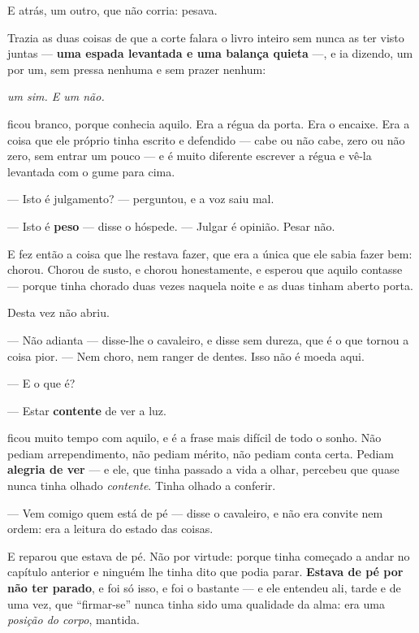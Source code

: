 \documentclass[livro.tex]{subfiles}
\begin{document}
\medskip
\noindent E atrás, um outro, que não corria: pesava.

\medskip
\noindent Trazia as duas coisas de que a corte falara o livro inteiro sem
nunca as ter visto juntas --- \textbf{uma espada levantada e uma balança
quieta} ---, e ia dizendo, um por um, sem pressa nenhuma e sem prazer nenhum:

\begin{center}
\emph{um sim. E um não.}
\end{center}

\noindent \Ben ficou branco, porque conhecia aquilo. Era a régua da porta. Era
o encaixe. Era a coisa que ele próprio tinha escrito e defendido --- cabe ou não
cabe, zero ou não zero, sem entrar um pouco --- e é muito diferente escrever a
régua e vê-la levantada com o gume para cima.

\medskip
\noindent --- Isto é julgamento? --- perguntou, e a voz saiu mal.

--- Isto é \textbf{peso} --- disse o hóspede. --- Julgar é opinião. Pesar não.

\medskip
\noindent E \Ben fez então a coisa que lhe restava fazer, que era a única que
ele sabia fazer bem: chorou. Chorou de susto, e chorou honestamente, e esperou
que aquilo contasse --- porque tinha chorado duas vezes naquela noite e as duas
tinham aberto porta.

Desta vez não abriu.

\medskip
\noindent --- Não adianta --- disse-lhe o cavaleiro, e disse sem dureza, que é
o que tornou a coisa pior. --- Nem choro, nem ranger de dentes. Isso não é
moeda aqui.

--- E o que é?

--- Estar \textbf{contente} de ver a luz.

\medskip
\noindent \Ben ficou muito tempo com aquilo, e é a frase mais difícil de todo
o sonho. Não pediam arrependimento, não pediam mérito, não pediam conta certa.
Pediam \textbf{alegria de ver} --- e ele, que tinha passado a vida a olhar,
percebeu que quase nunca tinha olhado \emph{contente}. Tinha olhado a conferir.

\medskip
\noindent --- Vem comigo quem está de pé --- disse o cavaleiro, e não era
convite nem ordem: era a leitura do estado das coisas.

\medskip
\noindent E \Ben reparou que estava de pé. Não por virtude: porque tinha
começado a andar no capítulo anterior e ninguém lhe tinha dito que podia parar.
\textbf{Estava de pé por não ter parado}, e foi só isso, e foi o bastante ---
e ele entendeu ali, tarde e de uma vez, que ``firmar-se'' nunca tinha sido uma
qualidade da alma: era uma \emph{posição do corpo}, mantida.
\end{document}
